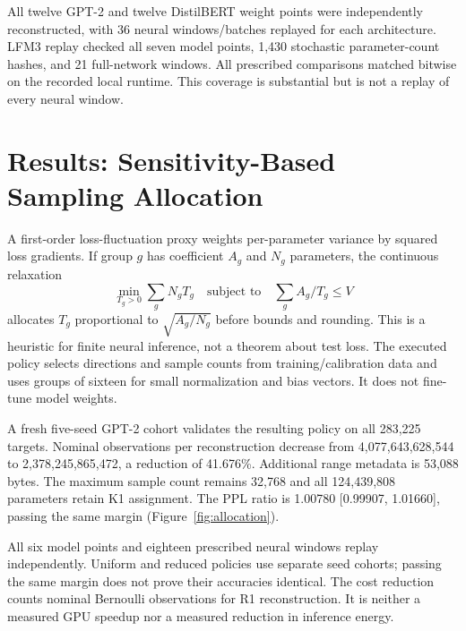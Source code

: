 \documentclass[11pt]{article}
\begin{document}
All twelve GPT-2 and twelve DistilBERT weight points were independently reconstructed, with 36 neural windows/batches replayed for each architecture. LFM3 replay checked all seven model points, 1,430 stochastic parameter-count hashes, and 21 full-network windows. All prescribed comparisons matched bitwise on the recorded local runtime. This coverage is substantial but is not a replay of every neural window.

\section{Results: Sensitivity-Based Sampling Allocation}
A first-order loss-fluctuation proxy weights per-parameter variance by squared loss gradients. If group $g$ has coefficient $A_g$ and $N_g$ parameters, the continuous relaxation
\begin{equation}
 \min_{T_g>0}\sum_g N_gT_g\quad\text{subject to}\quad
 \sum_g A_g/T_g\leq V
\end{equation}
allocates $T_g$ proportional to $\sqrt{A_g/N_g}$ before bounds and rounding. This is a heuristic for finite neural inference, not a theorem about test loss. The executed policy selects directions and sample counts from training/calibration data and uses groups of sixteen for small normalization and bias vectors. It does not fine-tune model weights.

A fresh five-seed GPT-2 cohort validates the resulting policy on all 283,225 targets. Nominal observations per reconstruction decrease from 4,077,643,628,544 to 2,378,245,865,472, a reduction of 41.676\%. Additional range metadata is 53,088 bytes. The maximum sample count remains 32,768 and all 124,439,808 parameters retain K1 assignment. The PPL ratio is 1.00780 [0.99907, 1.01660], passing the same margin (Figure~\ref{fig:allocation}).

All six model points and eighteen prescribed neural windows replay independently. Uniform and reduced policies use separate seed cohorts; passing the same margin does not prove their accuracies identical. The cost reduction counts nominal Bernoulli observations for R1 reconstruction. It is neither a measured GPU speedup nor a measured reduction in inference energy.

\end{document}
